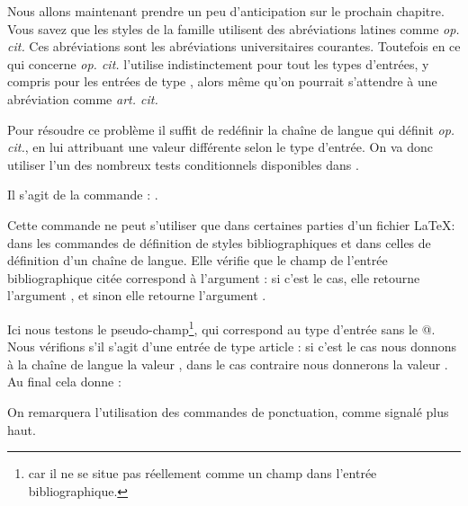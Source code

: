 Nous allons maintenant prendre un peu d'anticipation sur le prochain chapitre.
Vous savez  que les styles de la famille  utilisent des abréviations latines comme \emph{op. cit.}
Ces abréviations sont les abréviations universitaires courantes. Toutefois en ce qui concerne \emph{op. cit.}  l'utilise indistinctement pour tout les types d'entrées, y compris pour les entrées de type , alors même qu'on pourrait s'attendre à une abréviation comme \emph{art. cit.}

Pour résoudre ce problème il suffit de redéfinir la chaîne de langue qui définit \emph{op. cit.}, en lui attribuant une valeur différente selon le type d'entrée.  On va donc utiliser l'un des nombreux tests conditionnels disponibles dans . 

Il s'agit de la commande : .

Cette commande ne peut s'utiliser que dans certaines parties d'un fichier \LaTeX : dans les commandes de définition de styles bibliographiques et  dans celles de définition d'un chaîne de langue. 
Elle vérifie que le champ     de l'entrée bibliographique citée correspond à l'argument : si c'est le cas, elle retourne l'argument , et sinon elle retourne l'argument .

Ici nous testons le pseudo-champ\footnote{ car il ne se situe pas réellement comme un champ dans l'entrée bibliographique.}, qui correspond au type d'entrée sans le @. Nous vérifions  s'il s'agit d'une entrée de type article : si c'est le cas nous donnons à la chaîne de langue la valeur  ,  dans le cas contraire nous donnerons la valeur .
Au final cela donne : 

\begin{latexcode}
\end{latexcode}


On remarquera l'utilisation des commandes de ponctuation, comme signalé plus haut.



    
